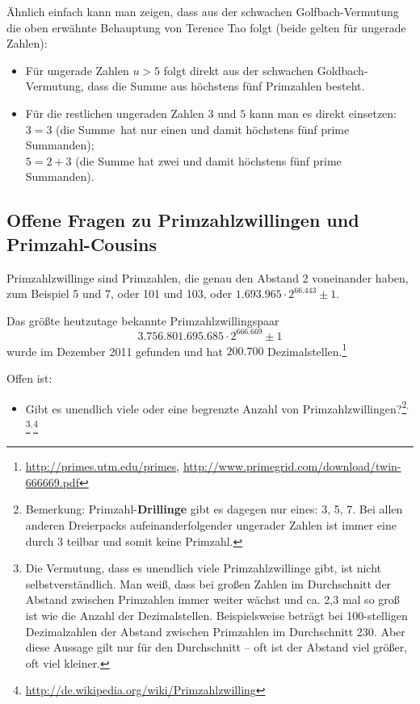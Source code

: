 \begin{refsegment}
Ähnlich einfach kann man zeigen, dass aus der schwachen Golfbach-Vermutung die
oben erwähnte Behauptung von Terence Tao folgt (beide gelten für ungerade
Zahlen):
\begin{itemize}	
   \item Für ungerade Zahlen $u>5$ folgt direkt aus der schwachen
      Goldbach-Vermutung, dass die Summe aus höchstens fünf Primzahlen besteht.
   \item Für die restlichen ungeraden Zahlen $3$ und $5$ kann man es direkt
      einsetzen:\\
      $3 = 3$ (die \glqq Summe\grqq~hat nur einen und damit höchstens
      fünf prime Summanden);\\
      $5 = 2 + 3$ (die Summe hat zwei und damit höchstens fünf prime Summanden).
\end{itemize}




\hypertarget{HT-TwinCousinPrimes}{}
\subsection{Offene Fragen zu Primzahlzwillingen und Primzahl-Cousins}
\label{L-TwinCousinPrimes}

Primzahlzwillinge sind Primzahlen, die genau den
Abstand 2 voneinander haben, zum Beispiel 5 und 7, oder 101 und 103,
oder $1.693.965 \cdot 2^{66.443} \pm 1$.

 Das größte heutzutage bekannte Primzahlzwillingspaar
\[3.756.801.695.685\cdot 2^{666.669} \pm 1\] wurde im
Dezember 2011 gefunden und hat $200.700$ Dezimalstellen.\footnote{%
   \url{http://primes.utm.edu/primes},
   \url{http://www.primegrid.com/download/twin-666669.pdf} }


 Offen ist:
\begin{itemize}
\item Gibt es unendlich viele oder eine begrenzte Anzahl von
      Primzahlzwillingen?\footnote{%
      Bemerkung: Primzahl-\textbf{Drillinge} gibt es dagegen nur eines: 3, 5, 7.
      Bei allen anderen Dreierpacks aufeinanderfolgender ungerader Zahlen ist
      immer eine durch 3 teilbar und somit keine Primzahl.
                                  }${}^,$\footnote{%
      Die Vermutung, dass es unendlich viele Primzahlzwillinge gibt, ist nicht
      selbstverständlich. Man weiß, dass bei großen Zahlen im Durchschnitt der
      Abstand zwischen Primzahlen immer weiter wächst und ca. 2,3 mal so groß
      ist wie die Anzahl der Dezimalstellen. Beispielsweise beträgt bei
      100-stelligen Dezimalzahlen der Abstand zwischen Primzahlen im
      Durchschnitt 230.
      Aber diese Aussage gilt nur für den Durchschnitt -- oft ist der Abstand
      viel größer, oft viel kleiner.
                                  }${}^,$\footnote{%
      \url{http://de.wikipedia.org/wiki/Primzahlzwilling}
      }


\end{itemize}
\end{refsegment}
